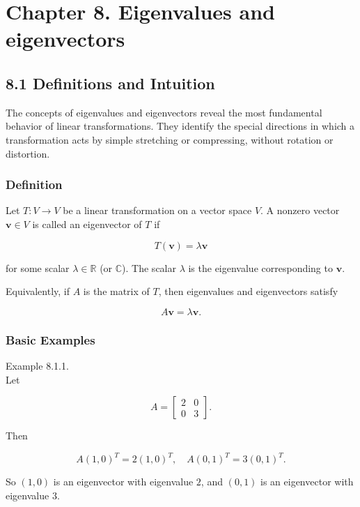 \documentclass[
  12pt,
  a4paper,
]{article}
\let\oldsection\section
\renewcommand{\section}{\clearpage\oldsection}
\begin{document}
\section{Chapter 8. Eigenvalues and
eigenvectors}\label{chapter-8-eigenvalues-and-eigenvectors}

\subsection{8.1 Definitions and
Intuition}\label{81-definitions-and-intuition}

The concepts of eigenvalues and eigenvectors reveal the most fundamental
behavior of linear transformations. They identify the special directions
in which a transformation acts by simple stretching or compressing,
without rotation or distortion.

\subsubsection{Definition}\label{definition-5}

Let \(T: V \to V\) be a linear transformation on a vector space \(V\). A
nonzero vector \(\mathbf{v} \in V\) is called an eigenvector of \(T\) if

\[T(\mathbf{v}) = \lambda \mathbf{v}\]

for some scalar \(\lambda \in \mathbb{R}\) (or \(\mathbb{C}\)). The
scalar \(\lambda\) is the eigenvalue corresponding to \(\mathbf{v}\).

Equivalently, if \(A\) is the matrix of \(T\), then eigenvalues and
eigenvectors satisfy

\[A\mathbf{v} = \lambda \mathbf{v}.\]

\subsubsection{Basic Examples}\label{basic-examples}

Example 8.1.1.\\
Let

\[A = \begin{bmatrix} 2 & 0 \\ 0 & 3 \end{bmatrix}.\]

Then

\[A(1,0)^T = 2(1,0)^T, \quad A(0,1)^T = 3(0,1)^T.\]

So \((1,0)\) is an eigenvector with eigenvalue \(2\), and \((0,1)\) is
an eigenvector with eigenvalue \(3\).
\end{document}

